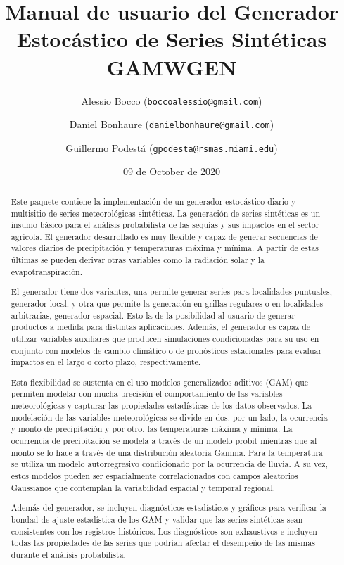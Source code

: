 \documentclass[
  12pt]{article}
\title{Manual de usuario del Generador Estocástico de Series Sintéticas GAMWGEN}
\author{Alessio Bocco (\href{mailto:boccoalessio@gmail.com}{\nolinkurl{boccoalessio@gmail.com}}) \and Daniel Bonhaure (\href{mailto:danielbonhaure@gmail.com}{\nolinkurl{danielbonhaure@gmail.com}}) \and Guillermo Podestá (\href{mailto:gpodesta@rsmas.miami.edu}{\nolinkurl{gpodesta@rsmas.miami.edu}})}
\date{09 de October de 2020}
\begin{document}
\maketitle
\begin{abstract}
Este paquete contiene la implementación de un generador estocástico diario y multisitio de series meteorológicas sintéticas. La generación de series sintéticas es un insumo básico para el análisis probabilista de las sequías y sus impactos en el sector agrícola. El generador desarrollado es muy flexible y capaz de generar secuencias de valores diarios de precipitación y temperaturas máxima y mínima. A partir de estas últimas se pueden derivar otras variables como la radiación solar y la evapotranspiración.

El generador tiene dos variantes, una permite generar series para localidades puntuales, generador local, y otra que permite la generación en grillas regulares o en localidades arbitrarias, generador espacial. Esto la de la posibilidad al usuario de generar productos a medida para distintas aplicaciones. Además, el generador es capaz de utilizar variables auxiliares que producen simulaciones condicionadas para su uso en conjunto con modelos de cambio climático o de pronósticos estacionales para evaluar impactos en el largo o corto plazo, respectivamente.

Esta flexibilidad se sustenta en el uso modelos generalizados aditivos (GAM) que permiten modelar con mucha precisión el comportamiento de las variables meteorológicas y capturar las propiedades estadísticas de los datos observados. La modelación de las variables meteorológicas se divide en dos: por un lado, la ocurrencia y monto de precipitación y por otro, las temperaturas máxima y mínima. La ocurrencia de precipitación se modela a través de un modelo probit mientras que al monto se lo hace a través de una distribución aleatoria Gamma. Para la temperatura se utiliza un modelo autorregresivo condicionado por la ocurrencia de lluvia. A su vez, estos modelos pueden ser espacialmente correlacionados con campos aleatorios Gaussianos que contemplan la variabilidad espacial y temporal regional.

Además del generador, se incluyen diagnósticos estadísticos y gráficos para verificar la bondad de ajuste estadística de los GAM y validar que las series sintéticas sean consistentes con los registros históricos. Los diagnósticos son exhaustivos e incluyen todas las propiedades de las series que podrían afectar el desempeño de las mismas durante el análisis probabilista.
\end{abstract}
\end{document}
